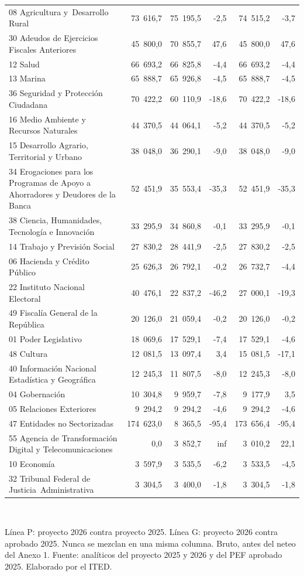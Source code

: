 \begin{table}[htbp]
\begin{tabular}{p{4.9cm}rrrrr}
08 Agricultura y Desarrollo Rural & 73 616,7 & 75 195,5 & -2,5 & 74 515,2 & -3,7 \\
30 Adeudos de Ejercicios Fiscales Anteriores & 45 800,0 & 70 855,7 & 47,6 & 45 800,0 & 47,6 \\
12 Salud & 66 693,2 & 66 825,8 & -4,4 & 66 693,2 & -4,4 \\
13 Marina & 65 888,7 & 65 926,8 & -4,5 & 65 888,7 & -4,5 \\
36 Seguridad y Protección Ciudadana & 70 422,2 & 60 110,9 & -18,6 & 70 422,2 & -18,6 \\
16 Medio Ambiente y Recursos Naturales & 44 370,5 & 44 064,1 & -5,2 & 44 370,5 & -5,2 \\
15 Desarrollo Agrario, Territorial y Urbano & 38 048,0 & 36 290,1 & -9,0 & 38 048,0 & -9,0 \\
34 Erogaciones para los Programas de Apoyo a Ahorradores y Deudores de la Banca & 52 451,9 & 35 553,4 & -35,3 & 52 451,9 & -35,3 \\
38 Ciencia, Humanidades, Tecnología e Innovación & 33 295,9 & 34 860,8 & -0,1 & 33 295,9 & -0,1 \\
14 Trabajo y Previsión Social & 27 830,2 & 28 441,9 & -2,5 & 27 830,2 & -2,5 \\
06 Hacienda y Crédito Público & 25 626,3 & 26 792,1 & -0,2 & 26 732,7 & -4,4 \\
22 Instituto Nacional Electoral & 40 476,1 & 22 837,2 & -46,2 & 27 000,1 & -19,3 \\
49 Fiscalía General de la República & 20 126,0 & 21 059,4 & -0,2 & 20 126,0 & -0,2 \\
01 Poder Legislativo & 18 069,6 & 17 529,1 & -7,4 & 17 529,1 & -4,6 \\
48 Cultura & 12 081,5 & 13 097,4 & 3,4 & 15 081,5 & -17,1 \\
40 Información Nacional Estadística y Geográfica & 12 245,3 & 11 807,5 & -8,0 & 12 245,3 & -8,0 \\
04 Gobernación & 10 304,8 & 9 959,7 & -7,8 & 9 177,9 & 3,5 \\
05 Relaciones Exteriores & 9 294,2 & 9 294,2 & -4,6 & 9 294,2 & -4,6 \\
47 Entidades no Sectorizadas & 174 623,0 & 8 365,5 & -95,4 & 173 656,4 & -95,4 \\
55 Agencia de Transformación Digital y Telecomunicaciones & 0,0 & 3 852,7 & inf & 3 010,2 & 22,1 \\
10 Economía & 3 597,9 & 3 535,5 & -6,2 & 3 533,5 & -4,5 \\
32 Tribunal Federal de Justicia Administrativa & 3 304,5 & 3 400,0 & -1,8 & 3 304,5 & -1,8 \\
\bottomrule
\end{tabular}
\\[2pt]\begin{minipage}{0.92\textwidth}\scriptsize Línea P: proyecto 2026 contra proyecto 2025. Línea G: proyecto 2026 contra aprobado 2025. Nunca se mezclan en una misma columna. Bruto, antes del neteo del Anexo 1. Fuente: analíticos del proyecto 2025 y 2026 y del PEF aprobado 2025. Elaborado por el ITED.\end{minipage}
\end{table}
